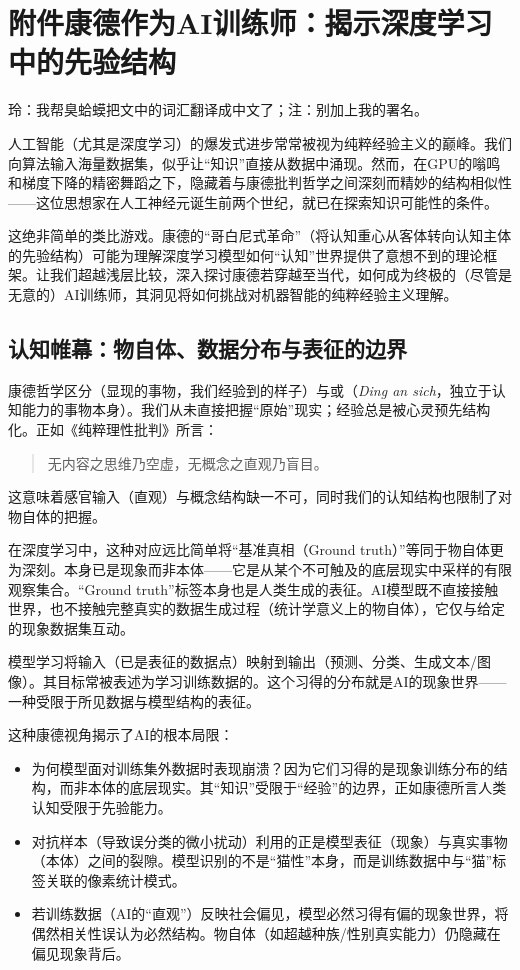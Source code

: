 \chapter*{附件\fullspace 康德作为AI训练师：揭示深度学习中的先验结构}

{\kaiti 玲：我帮臭蛤蟆把文中的词汇翻译成中文了；注：别加上我的署名。}

人工智能（尤其是深度学习）的爆发式进步常常被视为纯粹经验主义的巅峰。我们向算法输入海量数据集，似乎让“知识”直接从数据中涌现。然而，在GPU的嗡鸣和梯度下降的精密舞蹈之下，隐藏着与康德批判哲学之间深刻而精妙的结构相似性——这位思想家在人工神经元诞生前两个世纪，就已在探索知识可能性的条件。

这绝非简单的类比游戏。康德的“哥白尼式革命”（将认知重心从客体转向认知主体的先验结构）可能为理解深度学习模型如何“认知”世界提供了意想不到的理论框架。让我们超越浅层比较，深入探讨康德若穿越至当代，如何成为终极的（尽管是无意的）AI训练师，其洞见将如何挑战对机器智能的纯粹经验主义理解。

\section{认知帷幕：物自体、数据分布与表征的边界}

康德哲学区分（显现的事物，我们经验到的样子）与或（\textit{Ding an sich}，独立于认知能力的事物本身）。我们从未直接把握“原始”现实；经验总是被心灵预先结构化。正如《纯粹理性批判》所言：
\begin{quote}
无内容之思维乃空虚，无概念之直观乃盲目。
\end{quote}
这意味着感官输入（直观）与概念结构缺一不可，同时我们的认知结构也限制了对物自体的把握。

在深度学习中，这种对应远比简单将“基准真相（Ground truth）”等同于物自体更为深刻。本身已是现象而非本体——它是从某个不可触及的底层现实中采样的有限观察集合。“Ground truth”标签本身也是人类生成的表征。AI模型既不直接接触世界，也不接触完整真实的数据生成过程（统计学意义上的物自体），它仅与给定的现象数据集互动。

模型学习将输入（已是表征的数据点）映射到输出（预测、分类、生成文本/图像）。其目标常被表述为学习训练数据的。这个习得的分布就是AI的现象世界——一种受限于所见数据与模型结构的表征。

这种康德视角揭示了AI的根本局限：
\begin{itemize}
\item{} 为何模型面对训练集外数据时表现崩溃？因为它们习得的是现象训练分布的结构，而非本体的底层现实。其“知识”受限于“经验”的边界，正如康德所言人类认知受限于先验能力。
\item{} 对抗样本（导致误分类的微小扰动）利用的正是模型表征（现象）与真实事物（本体）之间的裂隙。模型识别的不是“猫性”本身，而是训练数据中与“猫”标签关联的像素统计模式。
\item{} 若训练数据（AI的“直观”）反映社会偏见，模型必然习得有偏的现象世界，将偶然相关性误认为必然结构。物自体（如超越种族/性别真实能力）仍隐藏在偏见现象背后。
\end{itemize}

